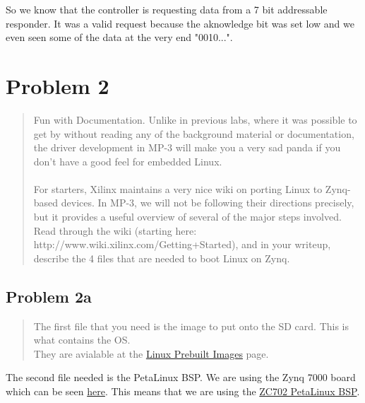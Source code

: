 \documentclass[10pt,a4paper]{article}
\let\oldsubsection\subsection
\renewcommand{\subsection}{%
    \setcounter{equation}{0}%
    \oldsubsection%
}
\begin{document}
So we know that the controller is requesting data from a 7 bit addressable responder. It was a valid request because the aknowledge bit was set low and we even seen some of the data at the very end "0010...".
 
\section{Problem 2}
\begin{quote}
Fun with Documentation. Unlike in previous labs, where it was possible to get by without reading any of the
background material or documentation, the driver development in MP-3 will make you a very sad panda if you don’t have a good feel for embedded Linux.\\
\\For starters, Xilinx maintains a very nice wiki on porting Linux to Zynq-based devices. In MP-3, we will not be
following their directions precisely, but it provides a useful overview of several of the major steps involved. Read
through the wiki (starting here: http://www.wiki.xilinx.com/Getting+Started), and in your writeup, describe the
4 files that are needed to boot Linux on Zynq.\\
\end{quote}

\subsection{Problem 2a}\begin{quote}

The first file that you need is the image to put onto the SD card. This is what contains the OS.\\ 
They are avialable at the \href{https://xilinx-wiki.atlassian.net/wiki/spaces/A/pages/18842316/Linux+Prebuilt+Images}{Linux Prebuilt Images} page.\\
\end{quote}

The second file needed is the PetaLinux BSP. We are using the Zynq 7000 board which can be seen \href{https://www.xilinx.com/products/boards-and-kits/ek-z7-zc702-g.html}{here}. This means that we are using the \href{https://www.xilinx.com/member/forms/download/xef.html?filename=xilinx-zc702-v2019.2-final.bsp}{ZC702 PetaLinux BSP}.\\
\end{document}
